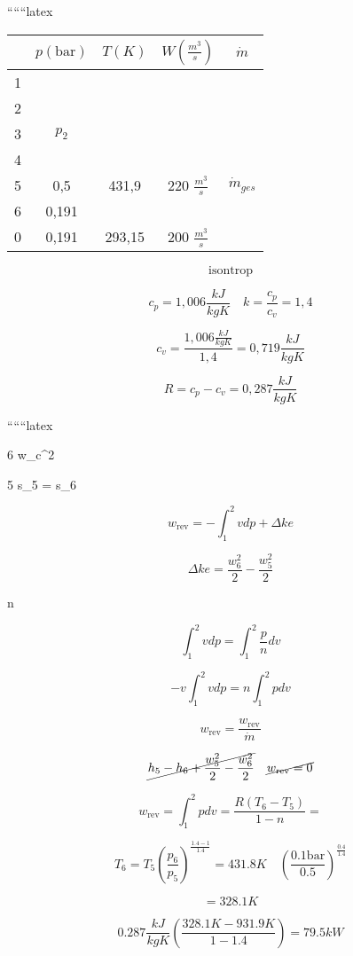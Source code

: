 
``````latex


\begin{tabular}{|c|c|c|c|c|}
\hline
 & $p \left( \text{bar} \right)$ & $T \left( K \right)$ & $W \left( \frac{m^3}{s} \right)$ & $\dot{m}$ \\
\hline
1 &  &  &  & \\
\hline
2 &  &  &  & \\
\hline
3 & $p_2$ &  &  & \\
\hline
4 &  &  &  & \\
\hline
5 & 0,5 & 431,9 & 220 $\frac{m^3}{s}$ & $\dot{m}_{ges}$ \\
\hline
6 & 0,191 &  &  & \\
\hline
0 & 0,191 & 293,15 & 200 $\frac{m^3}{s}$ & \\
\hline
\end{tabular}

\[
\text{isontrop}
\]

\[
c_p = 1,006 \frac{kJ}{kgK} \quad k = \frac{c_p}{c_v} = 1,4
\]

\[
c_v = \frac{1,006 \frac{kJ}{kgK}}{1,4} = 0,719 \frac{kJ}{kgK}
\]

\[
R = c_p - c_v = 0,287 \frac{kJ}{kgK}
\]

``````latex

6 \quad w_{c}^{2}

5  \quad {} \quad s_{5} = s_{6}

\[
w_{\text{rev}} = - \int_{1}^{2} vdp + \Delta ke
\]

\[
\Delta ke = \frac{w_{6}^{2}}{2} - \frac{w_{5}^{2}}{2}
\]

 \quad n 

\[
\int_{1}^{2} vdp = \int_{1}^{2} \frac{p}{n} dv
\]

\[
- v \int_{1}^{2} vdp = n \int_{1}^{2} pdv
\]

\[
w_{\text{rev}} = \frac{w_{\text{rev}}}{\dot{m}}
\]

\[
\cancel{h_{5} - h_{6} + \frac{w_{5}^{2}}{2} - \frac{w_{6}^{2}}{2}} \quad \cancel{w_{\text{rev}} = 0}
\]

\[
w_{\text{rev}} = \int_{1}^{2} pdv = \frac{R(T_{6} - T_{5})}{1 - n} =
\]

\[
T_{6} = T_{5} \left( \frac{p_{6}}{p_{5}} \right)^{\frac{1.4 - 1}{1.4}} = 431.8K \quad \left( \frac{0.1 \text{bar}}{0.5} \right)^{\frac{0.4}{1.4}}
\]

\[
= 328.1K
\]

\[
0.287 \frac{kJ}{kgK} \left( \frac{328.1K - 931.9K}{1 - 1.4} \right) = 79.5kW
\]

